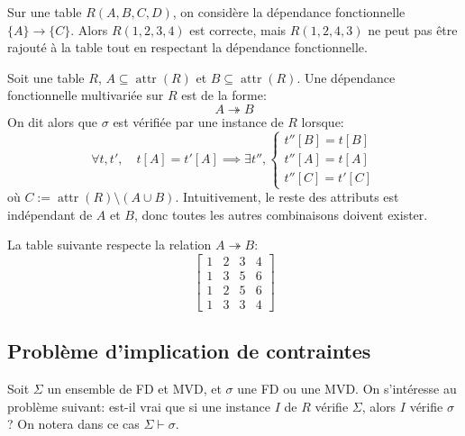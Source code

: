 \documentclass[french, toc]{../cs-classes/cs-classes}
\DeclareMathOperator{\attr}{attr}
\begin{document}
\begin{exemple}
    Sur une table $R(A, B, C, D)$, on considère la dépendance fonctionnelle $\{A\} \to \{C\}$. Alors $R(1, 2, 3, 4)$ est correcte, mais $R(1, 2, 4, 3)$ ne peut pas être rajouté à la table tout en respectant la dépendance fonctionnelle.
\end{exemple}

\begin{definition}
    Soit une table $R$, $A\subseteq\attr(R)$ et $B\subseteq\attr(R)$. Une dépendance fonctionnelle multivariée sur $R$ est de la forme:
    \begin{equation*}
        A \twoheadrightarrow B
    \end{equation*}
    On dit alors que $\sigma$ est vérifiée par une instance de $R$ lorsque:
    \begin{equation*}
        \forall t, t', \quad t[A]=t'[A] \implies \exists t'', \begin{cases}
             t''[B]=t[B] \\
             t''[A]=t[A]\\
             t''[C]= t'[C]
        \end{cases}
    \end{equation*}
    où $C:=\attr(R)\setminus (A\cup B)$. Intuitivement, le reste des attributs est indépendant de $A$ et $B$, donc toutes les autres combinaisons doivent exister.
\end{definition}

\begin{exemple}
    La table suivante respecte la relation $A \twoheadrightarrow B$:
    \begin{equation*}
        \begin{bmatrix}
            1&2&3&4\\
            1&3&5&6\\
            1&2&5&6\\
            1&3&3&4
        \end{bmatrix}
    \end{equation*}
\end{exemple}

\subsection{Problème d'implication de contraintes}
Soit $\Sigma$ un ensemble de FD et MVD, et $\sigma$ une FD ou une MVD. On s'intéresse au problème suivant: est-il vrai que si une instance $I$ de $R$ vérifie $\Sigma$, alors $I$ vérifie $\sigma$ ? On notera dans ce cas $\Sigma \vdash \sigma$.
\end{document}
